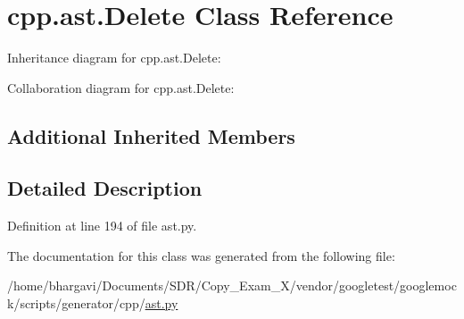 \hypertarget{classcpp_1_1ast_1_1_delete}{}\section{cpp.\+ast.\+Delete Class Reference}
\label{classcpp_1_1ast_1_1_delete}


Inheritance diagram for cpp.\+ast.\+Delete\+:


Collaboration diagram for cpp.\+ast.\+Delete\+:
\subsection*{Additional Inherited Members}


\subsection{Detailed Description}


Definition at line 194 of file ast.\+py.



The documentation for this class was generated from the following file\+:\begin{DoxyCompactItemize}
\item 
/home/bhargavi/\+Documents/\+S\+D\+R/\+Copy\+\_\+\+Exam\+\_\+X/vendor/googletest/googlemock/scripts/generator/cpp/\hyperlink{ast_8py}{ast.\+py}\end{DoxyCompactItemize}
